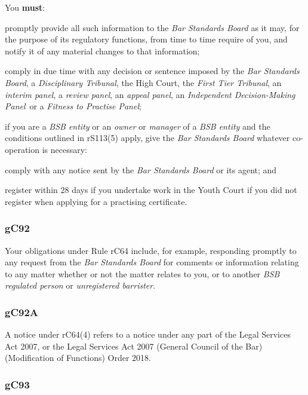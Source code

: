 You \textcolor{myred}{\textbf{must}}:
\begin{numlist}\item promptly provide all such information to the \emph{Bar Standards
Board} as it may, for the purpose of its regulatory functions, from time
to time require of you, and notify it of any material changes to that
information;
\item comply in due time with any decision or sentence imposed by the
\emph{Bar Standards Board}, a \emph{Disciplinary Tribunal}, the High
Court, the \emph{First Tier Tribunal}, an \emph{interim panel}, a
\emph{review panel}, an \emph{appeal panel}, an \emph{Independent
Decision-Making Panel}~or a \emph{Fitness to Practise Panel};
\item if you are a \emph{BSB entity} or an \emph{owner} or \emph{manager}
of a \emph{BSB entity} and the conditions outlined in rS113(5) apply,
give the \emph{Bar Standards Board} whatever co-operation is necessary:
\item comply with any notice sent by the \emph{Bar Standards Board} or its
agent; and
\item register within 28 days if you undertake work in the Youth Court if
you did not register when applying for a practising certificate.
\end{numlist}




\subsubsection{\color{darkgrey}gC92}

Your obligations under Rule rC64 include, for example, responding
promptly to any request from the \emph{Bar Standards Board} for comments
or information relating to any matter whether or not the matter relates
to you, or to another \emph{BSB regulated person} or \emph{unregistered
barrister}.

\subsubsection{\color{darkgrey}gC92A}

A notice under rC64(4) refers to a notice under any part of the Legal
Services Act 2007, or the Legal Services Act 2007 (General Council of
the Bar) (Modification of Functions) Order 2018.

\subsubsection{\color{darkgrey}gC93}

